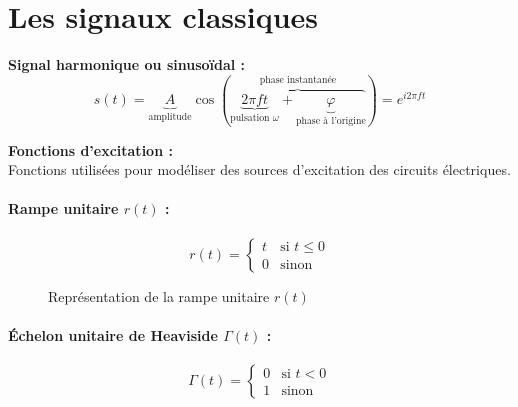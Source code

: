 \documentclass[a4paper,12pt]{report}
\begin{document}
\section{Les signaux classiques}

\textbf{Signal harmonique ou sinusoïdal :} \\
\[ s(t) = \underbrace{A}_{\text{amplitude}} \cos(\overbrace{\underbrace{2\pi ft}_{\text{pulsation }\omega} + \underbrace{\varphi}_{\text{phase à l'origine}}}^{\text{phase instantanée}}) = e^{i2\pi ft}\]

\textbf{Fonctions d'excitation :} \\
Fonctions utilisées pour modéliser des sources d'excitation des circuits électriques.

\paragraph{Rampe unitaire $r(t)$ :}
\[ r(t) =
\begin{cases}
    t & \text{si } t \leq 0 \\
    0 & \text{sinon}
\end{cases} \]

\begin{figure}[!htbp]
	\centering
	\caption{Représentation de la rampe unitaire $r(t)$}
\end{figure}

\paragraph{\'Echelon unitaire de Heaviside $\Gamma(t)$ :}

\[ \Gamma(t) =
\begin{cases}
    0 & \text{si } t < 0 \\
    1 & \text{sinon}
\end{cases} \]
\end{document}
